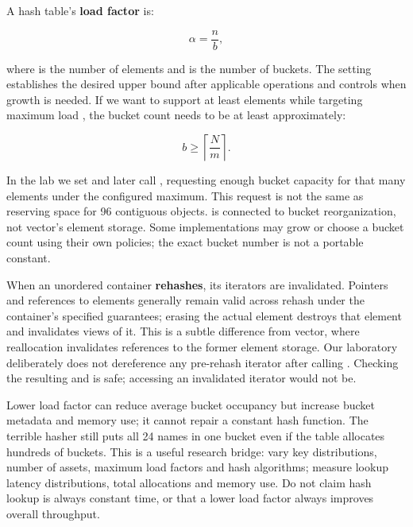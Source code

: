 \hypertarget{05-engine-i-ch005-load-factor-controls-rehash-pressure-not-the-absence-of-collisions}{}

A hash table's \textbf{load factor} is:

\[
\alpha = \frac{n}{b},
\]

where  is the number of elements and  is the number of buckets. The  setting establishes the desired upper bound after applicable operations and controls when growth is needed. If we want to support at least  elements while targeting maximum load , the bucket count needs to be at least approximately:

\[
b \ge \left\lceil \frac{N}{m} \right\rceil.
\]

In the lab we set  and later call , requesting enough bucket capacity for that many elements under the configured maximum. This request is not the same as reserving space for 96 contiguous objects.  is connected to bucket reorganization, not vector's element storage. Some implementations may grow or choose a bucket count using their own policies; the exact bucket number is not a portable constant.

When an unordered container \textbf{rehashes}, its iterators are invalidated. Pointers and references to elements generally remain valid across rehash under the container's specified guarantees; erasing the actual element destroys that element and invalidates views of it. This is a subtle difference from vector, where reallocation invalidates references to the former element storage. Our laboratory deliberately does not dereference any pre-rehash iterator after calling . Checking the resulting  and  is safe; accessing an invalidated iterator would not be.

Lower load factor can reduce average bucket occupancy but increase bucket metadata and memory use; it cannot repair a constant hash function. The terrible hasher still puts all 24 names in one bucket even if the table allocates hundreds of buckets. This is a useful research bridge: vary key distributions, number of assets, maximum load factors and hash algorithms; measure lookup latency distributions, total allocations and memory use. Do not claim hash lookup is always constant time, or that a lower load factor always improves overall throughput.

